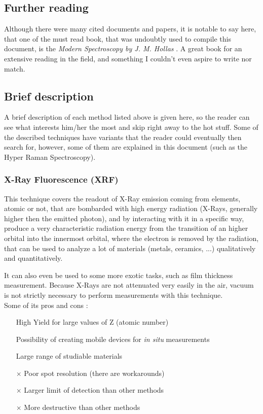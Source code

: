 \documentclass[]{article}
\begin{document}
\subsection{Further reading}
Although there were many cited documents and papers, it is notable to say here, that one of the must read book, that was undoubtly used to compile this document, is the \textit{Modern Spectroscopy by J. M. Hollas} \cite{JMH_Modern}. A great book for an extensive reading in the field, and something I couldn't even aspire to write nor match.

\subsection{Brief description}
A brief description of each method listed above is given here, so the reader can see what interests him/her the most and skip right away to the hot stuff. Some of the described techniques have variants that the reader could eventually then search for, however, some of them are explained in this document (such as the Hyper Raman Spectroscopy).

\subsubsection{X-Ray Fluorescence (XRF)} \label{XRF}
This technique covers the readout of X-Ray emission coming from elements, atomic or not, that are bombarded with high energy radiation (X-Rays, generally higher then the emitted photon), and by interacting with it in a specific way, produce a very characteristic radiation energy from the transition of an higher orbital into the innermost orbital, where the electron is removed by the radiation, that can be used to analyze a lot of materials (metals, ceramics, ...) qualitatively and quantitatively. 
\par It can also even be used to some more exotic tasks, such as film thickness measurement. Because X-Rays are not attenuated very easily in the air, vacuum is not strictly necessary to perform measurements with this technique.\\

Some of its pros and cons \cite{GI_XRF}:
\begin{itemize}
\item[\checkmark] High Yield for large values of Z (atomic number)
\item[\checkmark] Possibility of creating mobile devices for \textit{in situ} measurements
\item[\checkmark] Large range of studiable materials
\item[$\times$] Poor spot resolution (there are workarounds)
\item[$\times$] Larger limit of detection than other methods
\item[$\times$] More destructive than other methods
\end{itemize}
\end{document}
